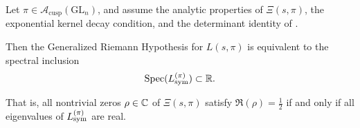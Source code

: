 \begin{theorem}
\label{thm:spec_real_equiv_grh}
Let \( \pi \in \mathcal{A}_{\mathrm{cusp}}(\mathrm{GL}_n) \), and assume the analytic properties of \( \Xi(s, \pi) \), the exponential kernel decay condition, and the determinant identity of .

Then the Generalized Riemann Hypothesis for \( L(s, \pi) \) is equivalent to the spectral inclusion
\[
\operatorname{Spec}(L_{\mathrm{sym}}^{(\pi)}) \subset \mathbb{R}.
\]

That is, all nontrivial zeros \( \rho \in \mathbb{C} \) of \( \Xi(s, \pi) \) satisfy \( \Re(\rho) = \tfrac{1}{2} \) if and only if all eigenvalues of \( L_{\mathrm{sym}}^{(\pi)} \) are real.
\end{theorem}
